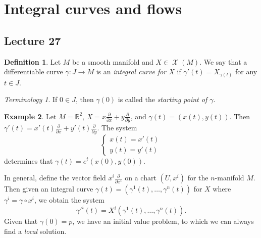 \documentclass[10pt,letterpaper,cm]{nupset}
\theoremstyle{definition}
\newtheorem{definition}{Definition}[subsection]
\newtheorem{exmp}[definition]{Example}
\theoremstyle{theorem}
\theoremstyle{remark}
\newtheorem*{term}{Terminology}
\newcommand{\R}{\mathbb R}
\newcommand{\1}{\mathbf{1}}
\newcommand{\0}{\vec 0}
\DeclareMathOperator{\vf}{\mathscr{X}}
\begin{document}
\section{Integral curves and flows}

\subsection{Lecture 27}

\begin{definition}
Let $M$ be a smooth manifold and $X\in \vf(M)$. We say that a differentiable curve $\gamma : J \to M$ is an \textit{integral curve for $X$} if $\gamma'(t) = X_{\gamma(t)}$ for any $t\in J$.
\end{definition}

\begin{term}
If $0\in J$, then $\gamma(0)$ is called the \textit{starting point of $\gamma$}.
\end{term}

\begin{exmp}
Let $M= \R^2$, $X = x\frac{\partial}{\partial{x}} + y \frac{\partial}{\partial{y}}$, and $\gamma(t) = \left(x(t), y(t)\right)$. Then $\gamma'(t) = x'(t)\frac{\partial}{\partial{x}}  + y'(t)\frac{\partial}{\partial{y}}$.  The system 
\[
\begin{cases} x(t) = x'(t) \\ y(t) = y'(t) \end{cases}
\] determines that 
$\gamma(t) = e^t(x(0), y(0))$.
\end{exmp}

\medskip


In general, define the vector field $x^i\frac{\partial}{\partial{x^i}}$ on a chart $(U, x^i)$ for the $n$-manifold $M$. Then given an integral curve $\gamma(t) = \left(\gamma^1(t), \ldots, \gamma^n(t)\right)$ for $X$ where $\gamma^i = \gamma \circ x^i$, we obtain the system $$ \gamma'^i(t) = X^i\left(\gamma^1(t), \ldots, \gamma^n(t)\right).  $$ Given that $\gamma(0) =p$, we have an initial value problem, to which we can always find a \emph{local} solution.

\smallskip
\end{document}
